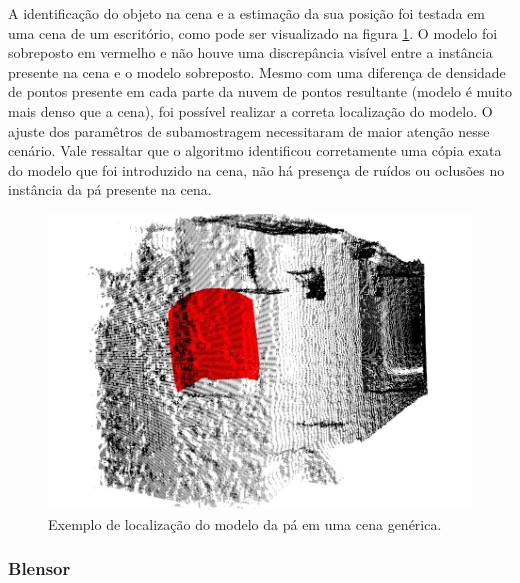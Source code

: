 A identificação do objeto na cena e a estimação da sua posição foi testada em
uma cena de um escritório, como pode ser visualizado na figura
\ref{fig::pa_cena_gen}. O modelo foi sobreposto em vermelho e não houve uma
discrepância visível entre a instância presente na cena e o modelo sobreposto. 
Mesmo com uma diferença de densidade de pontos presente em cada parte da nuvem
de pontos resultante (modelo é muito mais denso que a cena), foi possível
realizar a correta localização do modelo. O ajuste dos paramêtros de
subamostragem necessitaram de maior atenção nesse cenário. Vale ressaltar que o
algoritmo identificou corretamente uma cópia exata do modelo que foi introduzido
na cena, não há presença de ruídos ou oclusões no instância da pá presente na
cena.

\begin{figure}[h!]
	\centering
	\includegraphics[width=0.9\columnwidth]{method/figs/calibracao/blade_office5}
	\caption{Exemplo de localização do modelo da pá em uma cena genérica.}
    \label{fig::pa_cena_gen}
\end{figure}

\subsubsection{Blensor}

